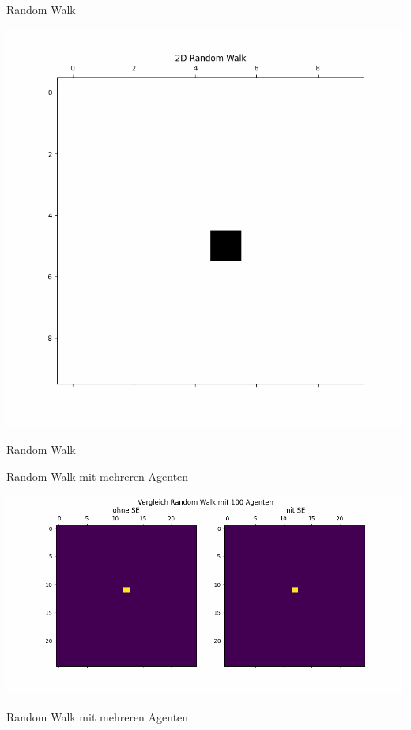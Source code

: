 \documentclass[xcolor=dvipsnames, aspectratio=169]{beamer}
\begin{document}
\begin{frame}[t]{Random Walk}
\begin{center}
\includegraphics[width=0.5\linewidth]{figures/RW/RW-0.png} 
\end{center}
\end{frame}

\begin{frame}[t]{Random Walk}
\begin{center}
\end{center}
\end{frame}

\begin{frame}{Random Walk mit mehreren Agenten}
\begin{center}
\includegraphics[width=0.7\linewidth]{figures/VergleichRW_SE/VergleichRW_SE-0.png} 
\end{center}
\end{frame}

\begin{frame}{Random Walk mit mehreren Agenten}
\begin{center}
\end{center}
\end{frame}
\end{document}
